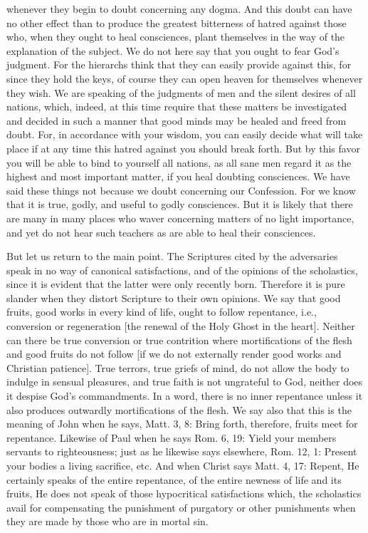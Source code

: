 whenever they begin to doubt concerning any dogma.  And this doubt
can have no other effect than to produce the greatest bitterness of
hatred against those who, when they ought to heal consciences, plant
themselves in the way of the explanation of the subject.  We do not
here say that you ought to fear God's judgment.  For the hierarchs
think that they can easily provide against this, for since they hold
the keys, of course they can open heaven for themselves whenever they
wish.  We are speaking of the judgments of men and the silent desires
of all nations, which, indeed, at this time require that these
matters be investigated and decided in such a manner that good minds
may be healed and freed from doubt.  For, in accordance with your
wisdom, you can easily decide what will take place if at any time
this hatred against you should break forth.  But by this favor you
will be able to bind to yourself all nations, as all sane men regard
it as the highest and most important matter, if you heal doubting
consciences.  We have said these things not because we doubt
concerning our Confession.  For we know that it is true, godly, and
useful to godly consciences.  But it is likely that there are many in
many places who waver concerning matters of no light importance, and
yet do not hear such teachers as are able to heal their consciences.

But let us return to the main point.  The Scriptures cited by the
adversaries speak in no way of canonical satisfactions, and of the
opinions of the scholastics, since it is evident that the latter were
only recently born.  Therefore it is pure slander when they distort
Scripture to their own opinions.  We say that good fruits, good works
in every kind of life, ought to follow repentance, i.e., conversion
or regeneration [the renewal of the Holy Ghost in the heart].
Neither can there be true conversion or true contrition where
mortifications of the flesh and good fruits do not follow [if we do
not externally render good works and Christian patience].  True
terrors, true griefs of mind, do not allow the body to indulge in
sensual pleasures, and true faith is not ungrateful to God, neither
does it despise God's commandments.  In a word, there is no inner
repentance unless it also produces outwardly mortifications of the
flesh.  We say also that this is the meaning of John when he says,
Matt. 3, 8: Bring forth, therefore, fruits meet for repentance.
Likewise of Paul when he says Rom. 6, 19: Yield your members servants
to righteousness; just as he likewise says elsewhere, Rom. 12, 1:
Present your bodies a living sacrifice, etc. And when Christ says
Matt. 4, 17: Repent, He certainly speaks of the entire repentance, of
the entire newness of life and its fruits, He does not speak of those
hypocritical satisfactions which, the scholastics avail for
compensating the punishment of purgatory or other punishments when
they are made by those who are in mortal sin.

